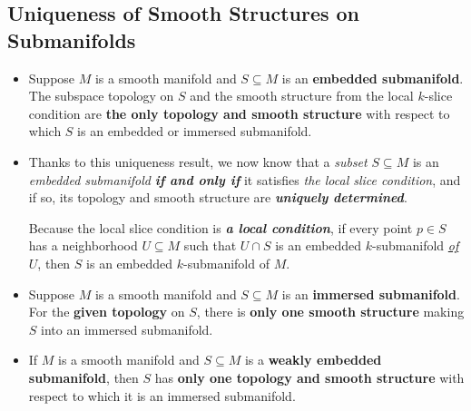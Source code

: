 \documentclass[11pt]{article}
\begin{document}
\subsection{Uniqueness of Smooth Structures on Submanifolds}
\begin{itemize}
\item \begin{theorem}
Suppose $M$ is a smooth manifold and $S \subseteq M$ is an \textbf{embedded submanifold}. The subspace topology on $S$ and the smooth structure from the local $k$-slice condition are \textbf{the only topology and smooth structure} with respect to which $S$ is an embedded or immersed submanifold.
\end{theorem}

\item \begin{remark}
Thanks to this uniqueness result, we now know that a \emph{subset} $S \subseteq M$ is an \emph{embedded submanifold} \emph{\textbf{if and only if}} it satisfies \emph{the local slice condition}, and if so, its topology and smooth structure are \emph{\textbf{uniquely determined}}.

Because the local slice condition is \emph{\textbf{a local condition}}, if every point $p \in S$ has a neighborhood \underline{$U \subseteq M$} such that \underline{$U \cap S$} is an embedded $k$-submanifold \underline{\emph{of $U$}}, then $S$ is an embedded $k$-submanifold of $M$.
\end{remark}

\item \begin{theorem}
Suppose $M$ is a smooth manifold and $S \subseteq M$ is an \textbf{immersed submanifold}. For the \textbf{given topology} on $S$, there is \textbf{only one smooth structure} making $S$ into an immersed submanifold.
\end{theorem}

\item \begin{theorem} If $M$ is a smooth manifold and $S \subseteq M$ is a \textbf{weakly embedded submanifold}, then $S$ has \textbf{only one topology and smooth structure} with respect to which it is an immersed submanifold.
\end{theorem}
\end{itemize}
\end{document}
